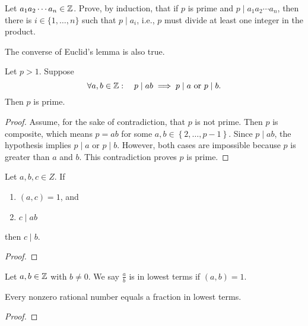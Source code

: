 \documentclass[11pt,a4paper]{article}
\begin{document}
\begin{eje}
    Let \(a_1 a_2 \cdots a_n\in \mathbb{Z}\).
    Prove, by induction, that if \(p\) is prime and \(p\mid a_1 a_2 \cdots a_n\), then there is \(i\in \{1,\ldots,n\}\) such that \(p\mid a_i\), i.e., \(p\) must divide at least one integer in the product.
\end{eje}

The converse of Euclid's lemma is also true.

\begin{prop}
    Let \(p>1\).
    Suppose
    \[\forall a,b\in \mathbb{Z}  :\quad p\mid ab\implies p\mid a \text{  or  } p\mid b.\]
    Then \(p\) is prime.
\end{prop}

\begin{proof}
    Assume, for the sake of contradiction, that \(p\) is not prime.
    Then \(p\) is composite, which means \(p=ab\) for some \(a,b\in \left\{ 2,\ldots, p-1 \right\}\).
    Since \(p\mid ab\), the hypothesis implies \(p\mid a\) or \(p\mid b\).
    However, both cases are impossible because \(p\) is greater than \(a\) and \(b\).
    This contradiction proves \(p\) is prime.
\end{proof}


\begin{prop}
    Let \(a,b,c\in Z\).
    If 
    \begin{enumerate}[label=(\roman*)]
        \item \((a,c) = 1\), and
        \item \(c\mid ab\)
    \end{enumerate}
    then \(c\mid b\).
\end{prop}


\begin{proof}
    
\end{proof}



\begin{defi}
    Let \(a,b\in \mathbb{Z}\) with \(b\neq 0\). We say \(\frac{a}{b}    \) is in lowest terms if \((a,b) = 1\).
\end{defi}

\begin{lem}
    Every nonzero rational number equals a fraction in lowest terms.
\end{lem}

\begin{proof}
    
\end{proof}
\end{document}
